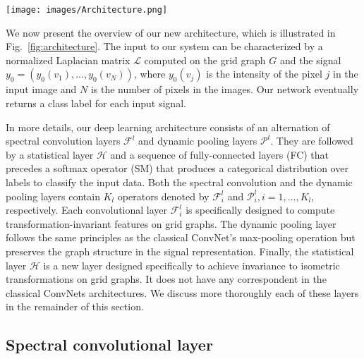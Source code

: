 \documentclass[10pt,journal,compsoc]{IEEEtran}
\begin{document}
	\begin{figure*}[tb!]
		\texttt{[image: images/Architecture.png]}
		\vspace{-1.0cm}
		\caption{{\bf TIGraNet} architecture. The network is composed of an alternation of spectral convolution layers $\mathcal{F}^{l}$  and dynamic pooling layers $\mathcal{P}^{l}$, followed by a statistical layer $\mathcal{H}$, multiple fully-connected layers (FC) and a softmax operator (SM). The input of the network is an image that is represented as a signal $y_0$ on the grid-graph with Laplacian matrix $\mathcal{L}$. The output of the system is a label that corresponds to the most likely class for the input sample.}
		\label{fig:architecture}
	\end{figure*}
	
	We now present the overview of our new architecture, which is illustrated in Fig.~\ref{fig:architecture}. The input to our system can be characterized by a normalized Laplacian matrix $\mathcal{L}$ computed on the grid graph $G$ and the signal $y_0 = (y_0(v_1), \dots, y_0(v_N))$, where $y_0(v_j)$ is the intensity of the pixel $j$ in the input image and $N$ is the number of pixels in the images. Our network eventually returns a class label for each input signal.
	
	In more details, our deep learning architecture consists of an alternation of spectral convolution layers $\mathcal{F}^{l}$ and dynamic pooling layers $\mathcal{P}^{l}$. They are followed by a statistical layer $\mathcal{H}$ and a sequence of fully-connected layers (FC) that precedes a softmax operator (SM) that produces a categorical distribution over labels to classify the input data. Both the spectral convolution and the dynamic pooling layers contain $K_l$ operators denoted by $\mathcal{F}_i^{l}$ and $\mathcal{P}_i^{l}, i=1,\dots,K_l$, respectively.  Each convolutional layer $\mathcal{F}_i^{l}$ is specifically designed to compute transformation-invariant features on grid graphs. The dynamic pooling layer follows the same principles as the classical ConvNet's max-pooling operation but preserves the graph structure in the signal representation. Finally, the statistical layer $\mathcal{H}$ is a new layer designed specifically to achieve invariance to isometric transformations on grid graphs. It does not have any correspondent in the classical ConvNets architectures. We discuss more thoroughly each of these layers in the remainder of this section.
	
	\subsection{Spectral convolutional layer}
	\label{s:conv}
	
\end{document}
